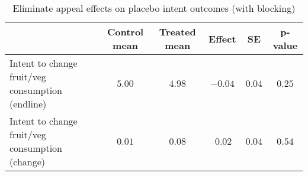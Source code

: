 \begin{table*}[ht]
\caption{Eliminate appeal effects on placebo intent outcomes (with blocking)\label{round}} 
\begin{center}
\begin{tabular}{lccccc}
\hline\hline
\multicolumn{1}{l}{}&\multicolumn{1}{c}{Control mean}&\multicolumn{1}{c}{Treated mean}&\multicolumn{1}{c}{Effect}&\multicolumn{1}{c}{SE}&\multicolumn{1}{c}{p-value}\tabularnewline
\hline
Intent to change fruit/veg consumption (endline)&$5.00$&$4.98$&$-0.04$&$0.04$&$0.25$\tabularnewline
Intent to change fruit/veg consumption (change)&$0.01$&$0.08$&$~0.02$&$0.04$&$0.54$\tabularnewline
\hline
\end{tabular}\end{center}

\end{table*}
